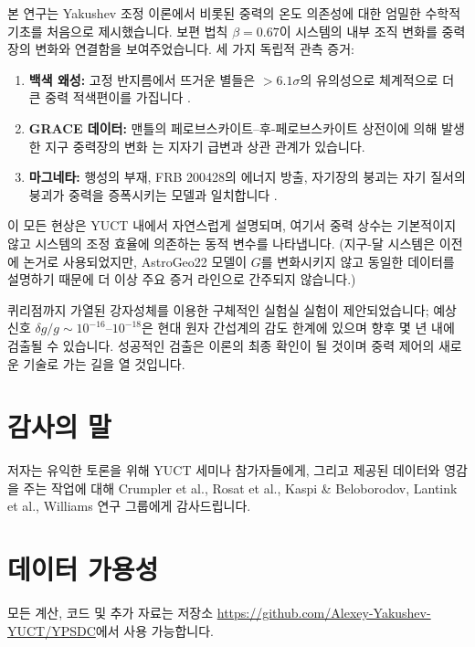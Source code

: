 \documentclass[11pt,a4paper]{article}
\begin{document}
	본 연구는 Yakushev 조정 이론에서 비롯된 중력의 온도 의존성에 대한 엄밀한 수학적 기초를 처음으로 제시했습니다. 보편 법칙 $\beta = 0.67$이 시스템의 내부 조직 변화를 중력장의 변화와 연결함을 보여주었습니다. 세 가지 독립적 관측 증거:
	\begin{enumerate}
		\item \textbf{백색 왜성:} 고정 반지름에서 뜨거운 별들은 $>6.1\sigma$의 유의성으로 체계적으로 더 큰 중력 적색편이를 가집니다 \cite{Crumpler2024}.
		\item \textbf{GRACE 데이터:} 맨틀의 페로브스카이트–후-페로브스카이트 상전이에 의해 발생한 지구 중력장의 변화 \cite{Rosat2025}는 지자기 급변과 상관 관계가 있습니다.
		\item \textbf{마그네타:} 행성의 부재, FRB 200428의 에너지 방출, 자기장의 붕괴는 자기 질서의 붕괴가 중력을 증폭시키는 모델과 일치합니다 \cite{Kaspi2017, Geng2020}.
	\end{enumerate}
	이 모든 현상은 YUCT 내에서 자연스럽게 설명되며, 여기서 중력 상수는 기본적이지 않고 시스템의 조정 효율에 의존하는 동적 변수를 나타냅니다. (지구-달 시스템은 이전에 논거로 사용되었지만, AstroGeo22 모델이 $G$를 변화시키지 않고 동일한 데이터를 설명하기 때문에 더 이상 주요 증거 라인으로 간주되지 않습니다.)
	
	퀴리점까지 가열된 강자성체를 이용한 구체적인 실험실 실험이 제안되었습니다; 예상 신호 $\delta g/g \sim 10^{-16}$–$10^{-18}$은 현대 원자 간섭계의 감도 한계에 있으며 향후 몇 년 내에 검출될 수 있습니다. 성공적인 검출은 이론의 최종 확인이 될 것이며 중력 제어의 새로운 기술로 가는 길을 열 것입니다.
	
	\section*{감사의 말}
	저자는 유익한 토론을 위해 YUCT 세미나 참가자들에게, 그리고 제공된 데이터와 영감을 주는 작업에 대해 Crumpler et al., Rosat et al., Kaspi \& Beloborodov, Lantink et al., Williams 연구 그룹에게 감사드립니다.
	
	\section*{데이터 가용성}
	모든 계산, 코드 및 추가 자료는 저장소 \url{https://github.com/Alexey-Yakushev-YUCT/YPSDC}에서 사용 가능합니다.
	
\end{document}
